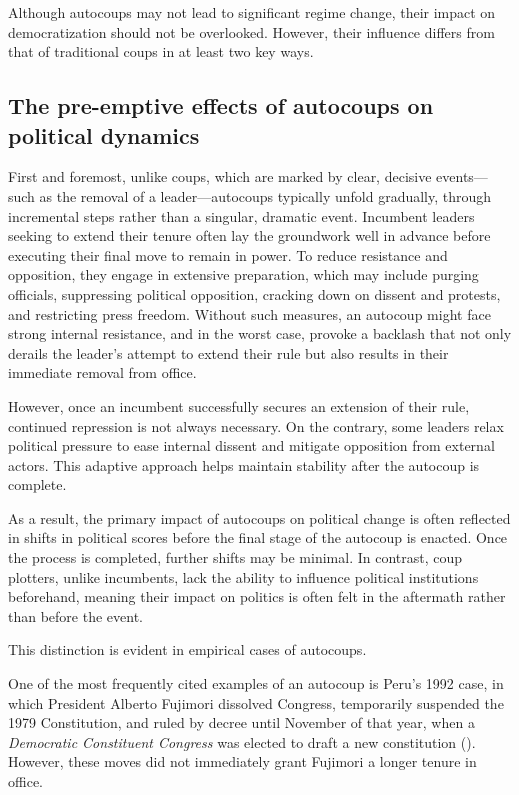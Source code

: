 \documentclass[
  12pt,
]{report}
\begin{document}
Although autocoups may not lead to significant regime change, their
impact on democratization should not be overlooked. However, their
influence differs from that of traditional coups in at least two key
ways.

\subsection{\texorpdfstring{\textbf{The pre-emptive effects of autocoups
on political
dynamics}}{The pre-emptive effects of autocoups on political dynamics}}\label{the-pre-emptive-effects-of-autocoups-on-political-dynamics}

First and foremost, unlike coups, which are marked by clear, decisive
events---such as the removal of a leader---autocoups typically unfold
gradually, through incremental steps rather than a singular, dramatic
event. Incumbent leaders seeking to extend their tenure often lay the
groundwork well in advance before executing their final move to remain
in power. To reduce resistance and opposition, they engage in extensive
preparation, which may include purging officials, suppressing political
opposition, cracking down on dissent and protests, and restricting press
freedom. Without such measures, an autocoup might face strong internal
resistance, and in the worst case, provoke a backlash that not only
derails the leader's attempt to extend their rule but also results in
their immediate removal from office.

However, once an incumbent successfully secures an extension of their
rule, continued repression is not always necessary. On the contrary,
some leaders relax political pressure to ease internal dissent and
mitigate opposition from external actors. This adaptive approach helps
maintain stability after the autocoup is complete.

As a result, the primary impact of autocoups on political change is
often reflected in shifts in political scores before the final stage of
the autocoup is enacted. Once the process is completed, further shifts
may be minimal. In contrast, coup plotters, unlike incumbents, lack the
ability to influence political institutions beforehand, meaning their
impact on politics is often felt in the aftermath rather than before the
event.

This distinction is evident in empirical cases of autocoups.

One of the most frequently cited examples of an autocoup is Peru's 1992
case, in which President Alberto Fujimori dissolved Congress,
temporarily suspended the 1979 Constitution, and ruled by decree until
November of that year, when a \emph{Democratic Constituent Congress} was
elected to draft a new constitution (). However, these moves did not immediately grant
Fujimori a longer tenure in office.
\end{document}
